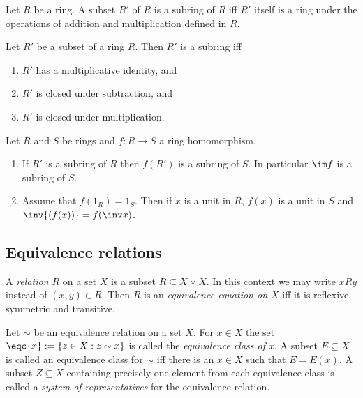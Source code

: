 \documentclass{article}
\begin{document}
\begin{definition}
	Let $R$ be a ring. A subset $R'$ of $R$ is a subring of $R$ iff $R'$ itself
	is a ring under the operations of addition and multiplication defined in $R$.
\end{definition}

\begin{proposition}[Proposition 3.4.26]
	Let $R'$ be a subset of a ring $R$. Then $R'$ is a subring iff
	\begin{enumerate}
		\item $R'$ has a multiplicative identity, and
		\item $R'$ is closed under subtraction, and
		\item $R'$ is closed under multiplication.
	\end{enumerate}
\end{proposition}

\begin{proposition}[Proposition 3.4.28]
	Let $R$ and $S$ be rings and $f:R\to S$ a ring homomorphism.
	\begin{enumerate}
		\item If $R'$ is a subring of $R$ then $f(R')$ is a subring of $S$. In particular
		      $\im f$ is a subring of $S$.
		\item Assume that $f(1_R)=1_S$. Then if $x$ is a unit in $R$, $f(x)$ is a unit
		      in $S$ and $\inv{(f(x))} = f(\inv x)$.
	\end{enumerate}
\end{proposition}

\subsection{Equivalence relations}

\begin{definition}
	A \emph{relation $R$} on a set $X$ is a subset $R\subseteq X\times X$. In this context we
	may write $xRy$ instead of $(x,y)\in R$. Then $R$ is an \emph{equivalence equation on $X$}
	iff it is reflexive, symmetric and transitive.
\end{definition}
\begin{definition}
	Let $\sim$ be an equivalence relation on a set $X$. For $x\in X$ the set $\eqc{x}:=\{z\in X:z\sim x\}$
	is called the \emph{equivalence class of $x$}. A subset $E\subseteq X$ is called an equivalence
	class for $\sim$ iff there is an $x\in X$ such that $E=E(x)$. A subset $Z\subseteq X$ containing
	precisely one element from each equivalence class is called a \emph{system of representatives}
	for the equivalence relation.
\end{definition}
\end{document}
